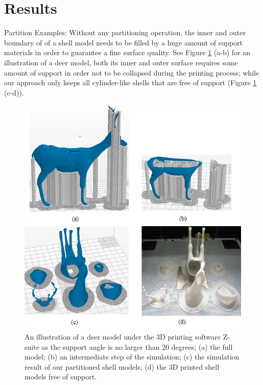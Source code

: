 \section{Results}

Partition Examples: Without any partitioning operation, the inner and outer boundary of of a shell model needs to be filled by a huge amount of support materials in order to guarantee a fine surface quality. See Figure \ref{fig:dear-simulation} (a-b) for an illustration of a deer model, both its inner and outer surface requires some amount of support in order not to be collapsed during the printing process; while our approach only keeps all cylinder-like shells that are free of support (Figure \ref{fig:dear-simulation} (c-d)).

\begin{figure}[tbp]
  \centering
  \includegraphics[width=\linewidth]{figs/dear-simulation.png}
  \caption{\label{fig:dear-simulation}%
           An illustration of a deer model under the 3D printing software Z-suite as the support angle is no larger than 20 degrees; (a) the full model; (b) an intermediate step of the simulation; (c) the simulation result of our partitioned shell models; (d) the 3D printed shell models free of support.}
\end{figure}

